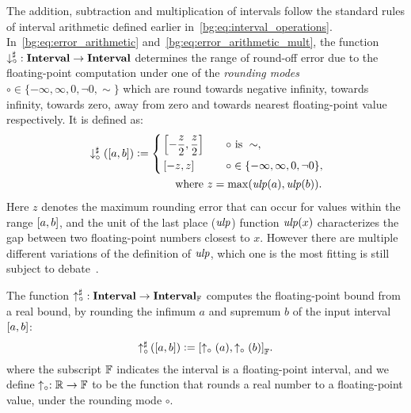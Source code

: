 The addition, subtraction and multiplication of intervals follow
the standard rules of interval arithmetic defined earlier
in~\eqref{bg:eq:interval_operations}.  In~\eqref{bg:eq:error_arithmetic}
and~\eqref{bg:eq:error_arithmetic_mult}, the function $\operatorname{\downarrow^\sharp_\circ}:
\mathbf{Interval} \to \mathbf{Interval}$ determines the range of round-off error due to
the floating-point computation under one of the \emph{rounding modes} $\circ
\in \{ -\infty, \infty, 0, \neg0, \sim \}$ which are round towards negative
infinity, towards infinity, towards zero, away from zero and towards nearest
floating-point value respectively.  It is defined as:
\begin{equation}
    \begin{aligned}
        & \downarrow^\sharp_\circ(\left[{a}, {b}\right]) \vcentcolon= \left\{
            \begin{aligned}
                & \left[ -\frac{z}{2}, \frac{z}{2}\right]
                    & \quad \circ & \text{~is~}\sim, \\
                & \left[ -z, z\right]
                    & \quad \circ & \in \{ -\infty, \infty, 0, \neg0 \},
            \end{aligned}
        \right. \\
        & \qquad\qquad\qquad\qquad \text{where~} z = \max(\operatorname{\mathit{ulp}}(a), \operatorname{\mathit{ulp}}(b)).
    \end{aligned}
\end{equation}
Here $z$ denotes the maximum rounding error that can occur for values
within the range $\left[{a}, {b}\right]$, and the unit of the last place ($\operatorname{\mathit{ulp}}$)
function $\operatorname{\mathit{ulp}}(x)$ characterizes the gap between two floating-point numbers
closest to $x$.  However there are multiple different variations of the
definition of $\operatorname{\mathit{ulp}}$, which one is the most fitting is still subject to
debate~\cite{muller}\footnotemark[3].

The function $\operatorname{\uparrow^\sharp_\circ}: \mathbf{Interval} \to \mathbf{Interval}_\mathbb{F}$ computes the
floating-point bound from a real bound, by rounding the infimum $a$ and
supremum $b$ of the input interval $\left[{a}, {b}\right]$:
\begin{equation}
    \operatorname{\uparrow^\sharp_\circ}\left(\left[a, b\right]\right)
    \vcentcolon= {\left[
        \uparrow_\circ{\left(a\right)},
        \uparrow_\circ{\left(b\right)}
    \right]}_\mathbb{F}.
\end{equation}
where the subscript $\mathbb{F}$ indicates the interval is a floating-point
interval, and we define $\uparrow_\circ: \mathbb{R} \to \mathbb{F}$ to be the
function that rounds a real number to a floating-point value, under the
rounding mode $\circ$.

